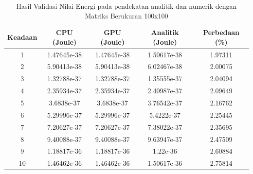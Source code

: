 \begin{table}[H]
	\centering
	\caption{Hasil Validasi Nilai Energi pada pendekatan analitik dan numerik dengan Matriks Berukuran 100x100}
	\label{tab:result_validation_1}
	\begin{tabular}{|c|c|c|c|c|}
		\hline
		\textbf{Keadaan} & \textbf{CPU (Joule)} & \textbf{GPU (Joule)} & \textbf{Analitik (Joule)} & \textbf{Perbedaan (\%)} \\
		\hline
		1                & 1.47645e-38          & 1.47645e-38          & 1.50617e-38               & 1.97311                 \\
		2                & 5.90413e-38          & 5.90413e-38          & 6.02467e-38               & 2.00075                 \\
		3                & 1.32788e-37          & 1.32788e-37          & 1.35555e-37               & 2.04094                 \\
		4                & 2.35934e-37          & 2.35934e-37          & 2.40987e-37               & 2.09649                 \\
		5                & 3.6838e-37           & 3.6838e-37           & 3.76542e-37               & 2.16762                 \\
		6                & 5.29996e-37          & 5.29996e-37          & 5.4222e-37                & 2.25445                 \\
		7                & 7.20627e-37          & 7.20627e-37          & 7.38022e-37               & 2.35695                 \\
		8                & 9.40088e-37          & 9.40088e-37          & 9.63947e-37               & 2.47509                 \\
		9                & 1.18817e-36          & 1.18817e-36          & 1.22e-36                  & 2.60884                 \\
		10               & 1.46462e-36          & 1.46462e-36          & 1.50617e-36               & 2.75814                 \\
		\hline
	\end{tabular}
\end{table}

